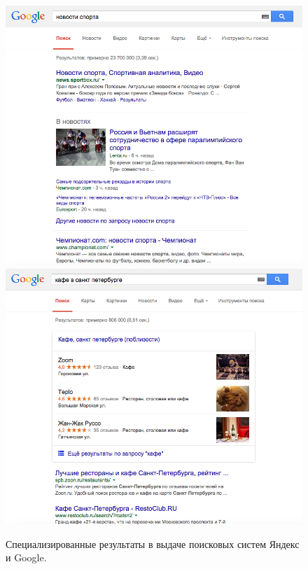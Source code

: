\documentclass[12pt,a4paper]{report}
\begin{document}
\begin{figure}[b!]
  \includegraphics[height=0.3\textheight]{pics/VerticalResults-News-Google.png}
  \includegraphics[height=0.3\textheight]{pics/VerticalResults-Places-Google.png}
  \caption{Специализированные результаты в выдаче поисковых систем Яндекс и Google.}
  \label{vertical-results}
\end{figure}
\end{document}
